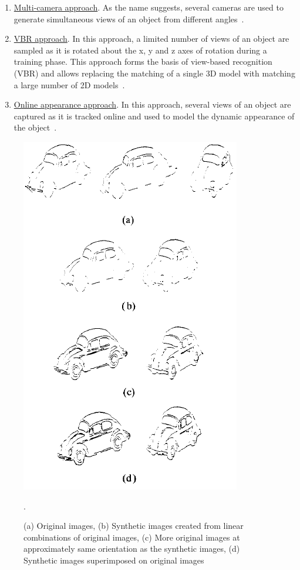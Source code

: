 \begin{enumerate}
\item \underline{Multi-camera approach}.  As the name suggests, several cameras are used to generate simultaneous views of an object from different angles~\cite{2000_JNL_EasyLiv_Krumm}.  
\item \underline{VBR approach}.  In this approach, a limited number of views of an object are sampled as it is rotated about the x, y and z axes of rotation during a training phase.  This approach forms the basis of view-based recognition (VBR) and allows replacing the matching of a single 3D model with matching a large number of 2D models~\cite{1992_JNL_VBR_Breuel, 1993_CNF_Gestures_Darrell}.
\item \underline{Online appearance approach}.  In this approach, several views of an object are captured as it is tracked online and used to model the dynamic appearance of the object~\cite{2008_JNL_subspaceTRK_Ross}.
\end{enumerate}
								\begin{figure}[t]
								\center
								\includegraphics[height=0.6\textheight]{thesis/1991_JNL_TRKsub_Ullman_fig3.png}
								\caption{(a) Original images, (b) Synthetic images created from linear combinations of original images, (c) More original images at approximately same orientation as the synthetic images, (d) Synthetic images superimposed on original images~\cite{1991_JNL_Recog_Ullman}}.
								\label{fig:1991_JNL_TRKsub_Ullman_fig3}
								\end{figure}

